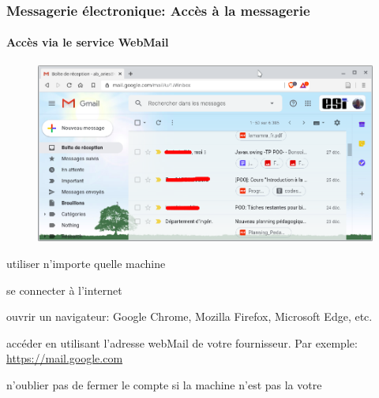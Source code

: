 \documentclass[xcolor=table]{beamer}
\begin{document}
\begin{frame}
\frametitle{Messagerie électronique: Accès à la messagerie}
\framesubtitle{Accès via le service WebMail}

\begin{figure}
	\vspace{-1cm}
	\includegraphics[width=.60\textwidth]{..//img/Bweb02-ri-gmail/webmail.png}
	\vspace{-1cm}
\end{figure}


\mysphere utiliser n'importe quelle machine

\mysphere se connecter à l'internet

\mysphere ouvrir un navigateur: Google Chrome, Mozilla Firefox, Microsoft Edge, etc.  

\mysphere accéder en utilisant l'adresse webMail de votre fournisseur. 
Par exemple: \url{https://mail.google.com}

\mysphere n'oublier pas de fermer le compte si la machine n'est pas la votre


\end{frame}
\end{document}

